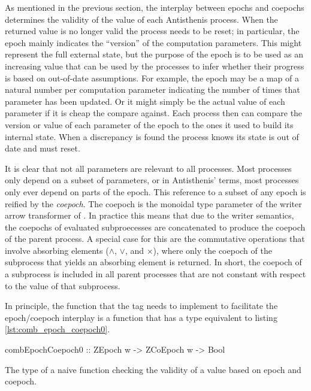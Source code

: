 As mentioned in the previous section, the interplay between epochs and
coepochs determines the validity of the value of each Antisthenis
process. When the returned value is no longer valid the process needs
to be reset; in particular, the epoch mainly indicates the ``version''
of the computation parameters. This might represent the full external
state, but the purpose of the epoch is to be used as an increasing
value that can be used by the processes to infer whether their
progress is based on out-of-date assumptions. For example, the epoch
may be a map of a natural number per computation parameter indicating
the number of times that parameter has been updated. Or it might
simply be the actual value of each parameter if it is cheap the
compare against. Each process then can compare the version or value of
each parameter of the epoch to the ones it used to build its internal
state. When a discrepancy is found the process knows its state is out
of date and must reset.

It is clear that not all parameters are relevant to all processes.
Most processes only depend on a subset of parameters, or in
Antisthenis' terms, most processes only ever depend on parts of the
epoch. This reference to a subset of any epoch is reified by the
\emph{coepoch}. The coepoch is the monoidal type parameter of the writer
arrow transformer of .  In practice this means that due
to the writer semantics, the coepochs of evaluated subproecesses are
concatenated to produce the coepoch of the parent process. A special
case for this are the commutative operations that involve absorbing
elements (\(\land\), \(\lor\), and \(\times\)), where only the coepoch
of the subprocess that yields an absorbing element is returned. In
short, the coepoch of a subprocess is included in all parent processes
that are not constant with respect to the value of that subprocess.

In principle, the function that the  tag needs to
implement to facilitate the epoch/coepoch interplay is a function that
has a type equivalent to listing \ref{lst:comb_epoch_coepoch0}.

\begin{code}
\begin{haskellcode}
combEpochCoepoch0 :: ZEpoch w -> ZCoEpoch w -> Bool
\end{haskellcode}
  \caption{\label{lst:comb_epoch_coepoch0}The type of a naive function
    checking the validity of a value based on epoch and coepoch.}
\end{code}

